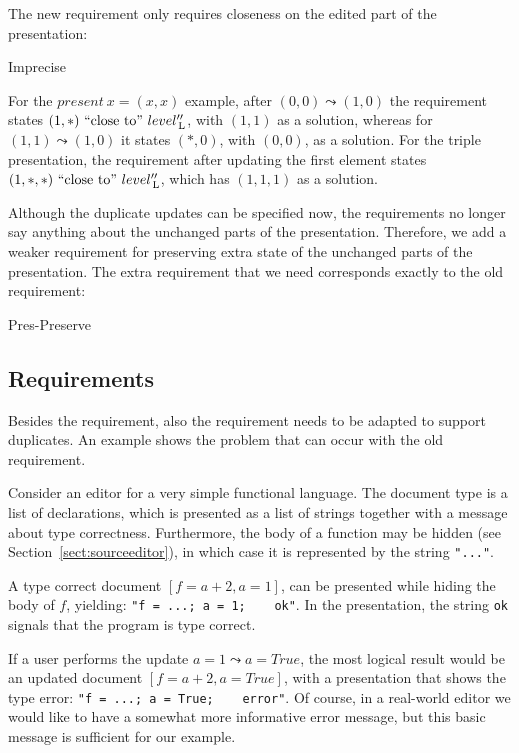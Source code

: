 The new  requirement only requires closeness on the edited part of the presentation:

	{Imprecise}

For the $present~x = (x,x)$ example, after $(0,0) \leadsto (1,0)$ the requirement states $(1,*) ~\text{``close to''}~ level''_{\, \mathrm L}$, with $(1,1)$ as a solution, whereas for $(1,1)\leadsto (1,0)$ it states $(*,0)$, with $(0,0)$, as a solution. For the triple presentation, the requirement after updating the first element states $(1,*,*) ~\text{``close to''}~ level''_{\, \mathrm L}$, which has $(1,1,1)$ as a solution.

Although the duplicate updates can be specified now, the requirements no longer say anything about the unchanged parts of the presentation. Therefore, we add a weaker requirement for preserving extra state of the unchanged parts of the presentation. The extra requirement that we need corresponds exactly to the old  requirement:

	{Pres-Preserve}

\subsection{Requirements} %

Besides the  requirement, also the  requirement needs to be adapted to support duplicates. An example shows the problem that can occur with the old  requirement.

Consider an editor for a very simple functional language. The document type is a list of declarations, which is presented as a list of strings together with a message about type correctness. Furthermore, the body of a function may be hidden (see Section~\ref{sect:sourceeditor}), in which case it is represented by the string \verb|"..."|. 

A type correct document $[f = a+2, a = 1]$, can be presented while hiding the body of $f$, yielding: \verb|"f = ...; a = 1;    ok"|. In the presentation, the string \verb|ok| signals that the program is type correct. 

If a user performs the update $a = 1 \leadsto a = True$, the most logical result would be an updated document 
$[f = a+2, a = True]$, with a presentation that shows the type error: \verb|"f = ...; a = True;    error"|. Of course, in a real-world editor we would like to have a somewhat more informative error message, but this basic message is sufficient for our example.

